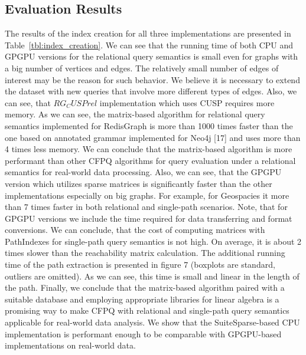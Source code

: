 \subsection{Evaluation Results}
The results of the index creation for all three implementations are presented in Table~\ref{tbl:index_creation}. We can see that the running time of both CPU
and GPGPU versions for the relational query semantics is
small even for graphs with a big number of vertices and
edges. The relatively small number of edges of interest may
be the reason for such behavior. We believe it is necessary
to extend the dataset with new queries that involve more
different types of edges. Also, we can see, that $RG_CUSPrel$
implementation which uses CUSP requires more memory.
As we can see, the matrix-based algorithm for relational
query semantics implemented for RedisGraph is more than
1000 times faster than the one based on annotated grammar
implemented for Neo4j [17] and uses more than 4 times less
memory. We can conclude that the matrix-based algorithm
is more performant than other CFPQ algorithms for query
evaluation under a relational semantics for real-world data
processing.
Also, we can see, that the GPGPU version which utilizes
sparse matrices is significantly faster than the other implementations especially on big graphs. For example, for
Geospacies it more than 7 times faster in both relational and
single-path scenarios. Note, that for GPGPU versions we
include the time required for data transferring and format
conversions.
We can conclude, that the cost of computing matrices
with PathIndexes for single-path query semantics is not high.
On average, it is about 2 times slower than the reachability
matrix calculation. The additional running time of the path
extraction is presented in figure 7 (boxplots are standard,
outliers are omitted). As we can see, this time is small and
linear in the length of the path.
Finally, we conclude that the matrix-based algorithm paired
with a suitable database and employing appropriate libraries
for linear algebra is a promising way to make CFPQ with
relational and single-path query semantics applicable for
real-world data analysis. We show that the SuiteSparse-based
CPU implementation is performant enough to be comparable
with GPGPU-based implementations on real-world data.

